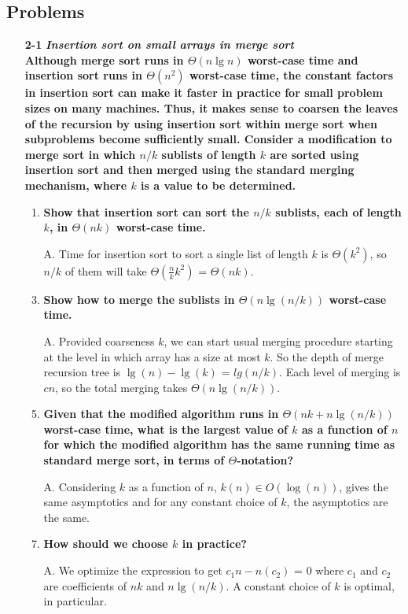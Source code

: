 \documentclass[fontsize=12pt,paper=a4,open=any]{book}
\begin{document}
\subsection*{Problems}
\begin{enumerate}
	\item[\textbf{2-1}]
		\textbf{\textit{Insertion sort on small arrays in merge sort}\\
		Although merge sort runs in $\Theta(n \lg n)$ worst-case time and insertion sort runs in $\Theta(n^2)$ worst-case time, the constant factors in insertion sort can make it faster in practice for small problem sizes on many machines. Thus, it makes sense to
coarsen the leaves of the recursion by using insertion sort within merge sort when subproblems become sufficiently small. Consider a modification to merge sort in
which $n/k$ sublists of length $k$ are sorted using insertion sort and then merged
using the standard merging mechanism, where $k$ is a value to be determined.
		}
		\begin{enumerate}
			\item \textbf{Show that insertion sort can sort the $n/k$ sublists, each of length $k$, in $\Theta(nk)$ worst-case time.}
			\item[A.]
			Time for insertion sort to sort a single list of length $k$ is $\Theta(k^2)$, so $n/k$ of them will take $\Theta(\frac{n}{k} k^2)$ = $\Theta(nk)$.			
			
			\item \textbf{Show how to merge the sublists in $\Theta(n \lg(n/k))$ worst-case time.}
			\item[A.]
			Provided coarseness $k$, we can start usual merging procedure starting at the level in which array has a size at most $k$. So the depth of merge recursion tree is $\lg(n)-\lg(k)$ = $lg(n/k)$. Each level of merging is $cn$, so the total merging takes $\Theta(n \lg(n/k))$.			
			
			\item \textbf{Given that the modified algorithm runs in $\Theta(nk + n \lg(n/k))$ worst-case time, what is the largest value of $k$ as a function of $n$ for which the modified algorithm has the same running time as standard merge sort, in terms of $\Theta$-notation?}
			\item[A.]
			Considering $k$ as a function of $n$, $k(n)\in O(\log(n))$, gives the same asymptotics and for any constant choice of $k$, the asymptotics are the same.
			
			\item \textbf{How should we choose $k$ in practice?}
			\item[A.]
			We optimize the expression to get $c_1n - n(c_2)$ = 0 where $c_1$ and $c_2$ are coefficients of $nk$ and $n \lg(n/k)$. A constant choice of $k$ is optimal, in particular.
		\end{enumerate}	
		

\end{enumerate}
\end{document}

